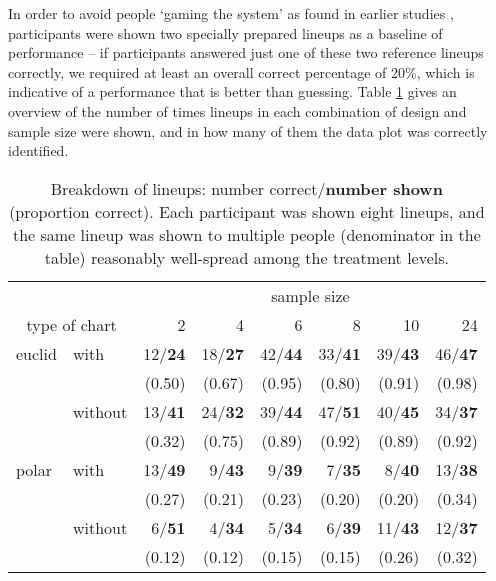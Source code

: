  In order to avoid people `gaming the system' as found in earlier studies \cite{heer:2010, kosara:2010}, participants were shown two specially prepared lineups as a baseline of performance -- if participants answered just one of these two reference lineups correctly, we required at least an overall correct percentage of 20\%, which is indicative of a performance that is better than guessing. Table \ref{tbl:treatment} gives an overview of the number of times lineups in each combination of design and sample size were shown, and in how many of them the data plot was correctly identified. 

\begin{table}[hbtp]
\resizebox{\linewidth}{!} {
	\begin{tabular}{ll@{   }r@{   }r@{   }r@{   }r@{   }r@{   }r}
	& & \multicolumn{6}{c}{sample size}  \\
        \multicolumn{2}{c}{type of chart} & 2 & 4 & 6 & 8 & 10 & 24 \\ [1pt] \hline 
	euclid & with & 12/{\bf 24}& 18/{\bf 27} & 42/{\bf 44} & 33/{\bf 41} & 39/{\bf 43} & 46/{\bf 47}\\
	       &      &(0.50)& (0.67) & (0.95) & (0.80) & (0.91) & (0.98)\\[1pt]
	& without & 13/{\bf 41} &24/{\bf 32}& 39/{\bf 44} & 47/{\bf 51} & 40/{\bf 45} & 34/{\bf 37}\\
	&         & (0.32) &(0.75)& (0.89) & (0.92) & (0.89) & (0.92)\\[3pt] %
	polar & with & 13/{\bf 49}& 9/{\bf 43} & 9/{\bf 39} & 7/{\bf 35} & 8/{\bf 40} & 13/{\bf 38} \\
	      &      & (0.27)& (0.21) & (0.23) & (0.20) & (0.20) & (0.34) \\[1pt]
	& without & 6/{\bf 51}&   4/{\bf 34} &  5/{\bf 34} &  6/{\bf 39} & 11/{\bf 43} &  12/{\bf 37} \\
        &         & (0.12) & (0.12) &  (0.15) &  (0.15) & (0.26) &  (0.32)\\ 
	\end{tabular}
	}
\caption{\label{tbl:treatment} Breakdown of lineups: number correct/\textbf{number shown} (proportion correct). Each participant was shown eight lineups, and the same lineup was shown to multiple people (denominator in the table) reasonably well-spread among the treatment levels. }
\end{table}


